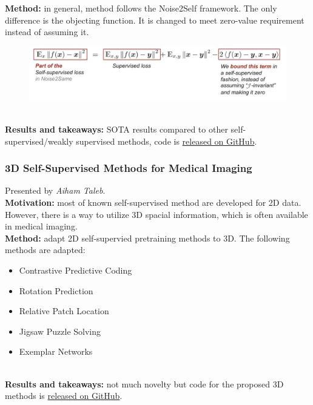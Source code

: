 {\bf Method:} in general, method follows the Noise2Self framework. The only difference is the objecting function. It is changed to meet zero-value requirement instead of assuming it. \\

\begin{figure}[h!]
    \centering
    \includegraphics[scale=0.4]{neurips-2020/images/Screenshot 2020-12-12 at 14.58.30.png}
\end{figure} \\

{\bf Results and takeaways:} SOTA results compared to other self-supervised/weakly supervised methods, code is \href{https://github.com/divelab/Noise2Same}{released on GitHub}. \\




\subsubsection{3D Self-Supervised Methods for Medical Imaging \cite{TalebLDSGBL20}}

Presented by \textit{Aiham Taleb}.  \\

{\bf Motivation:} most of known self-supervised method are developed for 2D data. However, there is a way to utilize 3D spacial information, which is often available in medical imaging. \\

{\bf Method:} adapt 2D self-supervied pretraining methods to 3D. The following methods are adapted:
\begin{itemize}
    \item Contrastive Predictive Coding
    \item Rotation Prediction
    \item Relative Patch Location
    \item Jigsaw Puzzle Solving
    \item Exemplar Networks
\end{itemize} \\

{\bf Results and takeaways:} not much novelty but code for the proposed 3D methods is \href{https://github.com/HealthML/self-supervised-3d-tasks}{released on GitHub}. \\